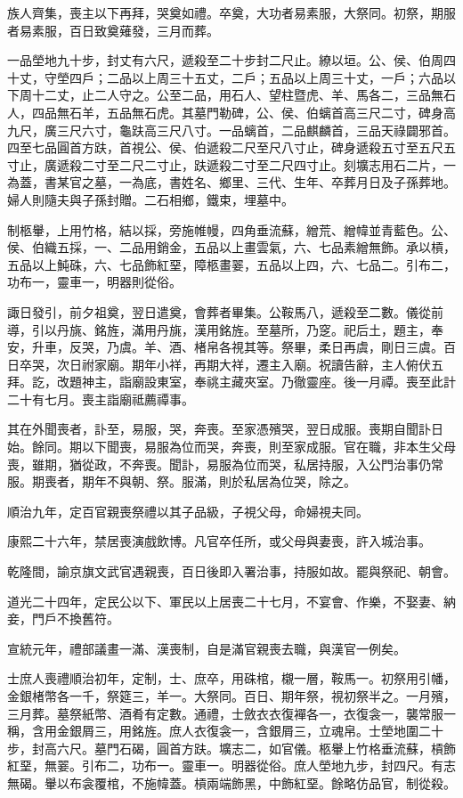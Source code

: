 \begin{pinyinscope}
族人齊集，喪主以下再拜，哭奠如禮。卒奠，大功者易素服，大祭同。初祭，期服者易素服，百日致奠薙發，三月而葬。

一品塋地九十步，封丈有六尺，遞殺至二十步封二尺止。繚以垣。公、侯、伯周四十丈，守塋四戶；二品以上周三十五丈，二戶；五品以上周三十丈，一戶；六品以下周十二丈，止二人守之。公至二品，用石人、望柱暨虎、羊、馬各二，三品無石人，四品無石羊，五品無石虎。其墓門勒碑，公、侯、伯螭首高三尺二寸，碑身高九尺，廣三尺六寸，龜趺高三尺八寸。一品螭首，二品麒麟首，三品天祿闢邪首。四至七品圓首方趺，首視公、侯、伯遞殺二尺至尺八寸止，碑身遞殺五寸至五尺五寸止，廣遞殺二寸至二尺二寸止，趺遞殺二寸至二尺四寸止。刻壙志用石二片，一為蓋，書某官之墓，一為底，書姓名、鄉里、三代、生年、卒葬月日及子孫葬地。婦人則隨夫與子孫封贈。二石相鄉，鐵束，埋墓中。

制柩轝，上用竹格，結以採，旁施帷幔，四角垂流蘇，繒荒、繒幃並青藍色。公、侯、伯織五採，一、二品用銷金，五品以上畫雲氣，六、七品素繒無飾。承以槓，五品以上魨硃，六、七品飾紅堊，障柩畫翣，五品以上四，六、七品二。引布二，功布一，靈車一，明器則從俗。

諏日發引，前夕祖奠，翌日遣奠，會葬者畢集。公鞍馬八，遞殺至二數。儀從前導，引以丹旐、銘旌，滿用丹旐，漢用銘旌。至墓所，乃窆。祀后土，題主，奉安，升車，反哭，乃虞。羊、酒、楮帛各視其等。祭畢，柔日再虞，剛日三虞。百日卒哭，次日祔家廟。期年小祥，再期大祥，遷主入廟。祝讀告辭，主人俯伏五拜。訖，改題神主，詣廟設東室，奉祧主藏夾室。乃徹靈座。後一月禫。喪至此計二十有七月。喪主詣廟祗薦禫事。

其在外聞喪者，訃至，易服，哭，奔喪。至家憑殯哭，翌日成服。喪期自聞訃日始。餘同。期以下聞喪，易服為位而哭，奔喪，則至家成服。官在職，非本生父母喪，雖期，猶從政，不奔喪。聞訃，易服為位而哭，私居持服，入公門治事仍常服。期喪者，期年不與朝、祭。服滿，則於私居為位哭，除之。

順治九年，定百官親喪祭禮以其子品級，子視父母，命婦視夫同。

康熙二十六年，禁居喪演戲飲博。凡官卒任所，或父母與妻喪，許入城治事。

乾隆間，諭京旗文武官遇親喪，百日後即入署治事，持服如故。罷與祭祀、朝會。

道光二十四年，定民公以下、軍民以上居喪二十七月，不宴會、作樂，不娶妻、納妾，門戶不換舊符。

宣統元年，禮部議畫一滿、漢喪制，自是滿官親喪去職，與漢官一例矣。

士庶人喪禮順治初年，定制，士、庶卒，用硃棺，櫬一層，鞍馬一。初祭用引幡，金銀楮幣各一千，祭筵三，羊一。大祭同。百日、期年祭，視初祭半之。一月殯，三月葬。墓祭紙幣、酒肴有定數。通禮，士斂衣衣復襌各一，衣復衾一，襲常服一稱，含用金銀屑三，用銘旌。庶人衣復衾一，含銀屑三，立魂帛。士塋地圍二十步，封高六尺。墓門石碣，圓首方趺。壙志二，如官儀。柩轝上竹格垂流蘇，槓飾紅堊，無翣。引布二，功布一。靈車一。明器從俗。庶人塋地九步，封四尺。有志無碣。轝以布衾覆棺，不施幃蓋。槓兩端飾黑，中飾紅堊。餘略仿品官，制從殺。


\end{pinyinscope}
